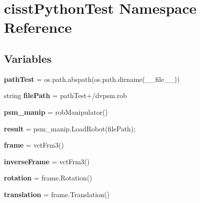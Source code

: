 \hypertarget{namespacecisstPythonTest}{}\section{cisst\+Python\+Test Namespace Reference}
\label{namespacecisstPythonTest}
\subsection*{Variables}
\begin{DoxyCompactItemize}
\item 
{\bfseries path\+Test} = os.\+path.\+abspath(os.\+path.\+dirname(\+\_\+\+\_\+file\+\_\+\+\_\+))\hypertarget{namespacecisstPythonTest_a428d6694587c818cb50cf0e289f322be}{}\label{namespacecisstPythonTest_a428d6694587c818cb50cf0e289f322be}

\item 
string {\bfseries file\+Path} = path\+Test+\textquotesingle{}/dvpsm.\+rob\textquotesingle{}\hypertarget{namespacecisstPythonTest_a46990aa1a6d15c1f6e45a1264ac2043f}{}\label{namespacecisstPythonTest_a46990aa1a6d15c1f6e45a1264ac2043f}

\item 
{\bfseries psm\+\_\+manip} = rob\+Manipulator()\hypertarget{namespacecisstPythonTest_a54dcfe6fb21415cb239da2e40debbf18}{}\label{namespacecisstPythonTest_a54dcfe6fb21415cb239da2e40debbf18}

\item 
{\bfseries result} = psm\+\_\+manip.\+Load\+Robot(file\+Path);\hypertarget{namespacecisstPythonTest_a9ed51a3d903c561b3eb3160564821d5f}{}\label{namespacecisstPythonTest_a9ed51a3d903c561b3eb3160564821d5f}

\item 
{\bfseries frame} = vct\+Frm3()\hypertarget{namespacecisstPythonTest_a567cdb956141fb3c61a42f501fa4f999}{}\label{namespacecisstPythonTest_a567cdb956141fb3c61a42f501fa4f999}

\item 
{\bfseries inverse\+Frame} = vct\+Frm3()\hypertarget{namespacecisstPythonTest_a8bbb7abe7ba4ae1ba68df48b1106df4a}{}\label{namespacecisstPythonTest_a8bbb7abe7ba4ae1ba68df48b1106df4a}

\item 
{\bfseries rotation} = frame.\+Rotation()\hypertarget{namespacecisstPythonTest_abc25679cc1285ffb8fae1517fa7eb904}{}\label{namespacecisstPythonTest_abc25679cc1285ffb8fae1517fa7eb904}

\item 
{\bfseries translation} = frame.\+Translation()\hypertarget{namespacecisstPythonTest_a2983c672448be24ed872afdd9f34185c}{}\label{namespacecisstPythonTest_a2983c672448be24ed872afdd9f34185c}


\end{DoxyCompactItemize}

